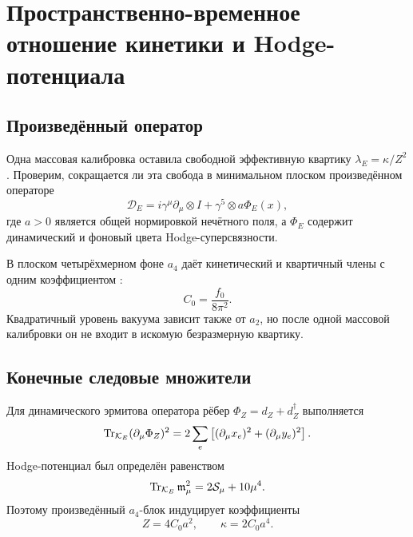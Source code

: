 \chapter{Пространственно-временное отношение кинетики и Hodge-потенциала}
\label{ch:v7-spacetime-kinetic-potential-ratio-admission-gate}

\section{Произведённый оператор}

Одна массовая калибровка оставила свободной эффективную квартику
$\lambda_E=\kappa/Z^2$. Проверим, сокращается ли эта свобода в минимальном
плоском произведённом операторе
\begin{equation}
 \mathcal D_E
 =i\gamma^\mu\partial_\mu\otimes I
 +\gamma^5\otimes a\Phi_E(x),
 \label{eq:v7-spacetime-ratio-product-dirac}
\end{equation}
где $a>0$ является общей нормировкой нечётного поля, а $\Phi_E$ содержит
динамический и фоновый цвета Hodge-суперсвязности.

В плоском четырёхмерном фоне $a_4$ даёт кинетический и квартичный члены с
одним коэффициентом \cite{v7-spacetime-ratio-spectral-action}:
\begin{equation}
 C_0=\frac{f_0}{8\pi^2}.
 \label{eq:v7-spacetime-ratio-common-coefficient}
\end{equation}
Квадратичный уровень вакуума зависит также от $a_2$, но после одной
массовой калибровки он не входит в искомую безразмерную квартику.

\section{Конечные следовые множители}

Для динамического эрмитова оператора рёбер
$\Phi_Z=d_Z+d_Z^\dagger$ выполняется
\begin{equation}
 \operatorname{Tr}_{\mathcal K_E}(\partial_\mu\Phi_Z)^2
 =2\sum_e\left[(\partial_\mu x_e)^2+(\partial_\mu y_e)^2\right].
 \label{eq:v7-spacetime-ratio-kinetic-trace}
\end{equation}
Hodge-потенциал был определён равенством
\begin{equation}
 \operatorname{Tr}_{\mathcal K_E}\mathfrak m_\mu^2
 =2\mathcal S_\mu+10\mu^4.
 \label{eq:v7-spacetime-ratio-potential-trace}
\end{equation}
Поэтому произведённый $a_4$-блок индуцирует коэффициенты
\begin{equation}
 Z=4C_0a^2,
 \qquad
 \kappa=2C_0a^4.
 \label{eq:v7-spacetime-ratio-induced-coefficients}
\end{equation}

